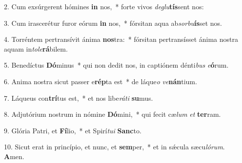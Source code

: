 2. Cum exsúrgerent hómines \textbf{in} nos,~*  forte vivos \textit{de}\textit{glu}\textbf{tís}sent nos:\

3. Cum irascerétur furor eórum \textbf{in} nos,~*  fórsitan aqua ab\textit{sor}\textit{bu}\textbf{ís}set nos.\

4. Torréntem pertransívit ánima \textbf{nos}tra:~*  fórsitan pertransísset ánima nostra aquam in\textit{to}\textit{le}\textbf{rá}bilem.\

5. Benedíctus \textbf{Dó}minus~*  qui non dedit nos, in captiónem dénti\textit{bus} \textit{e}\textbf{ó}rum.\

6. Anima nostra sicut passer e\textbf{rép}ta est~*  de láque\textit{o} \textit{ve}\textbf{nán}tium.\

7. Láqueus con\textbf{trí}tus est,~*  et nos libe\textit{rá}\textit{ti} \textbf{su}mus.\

8. Adjutórium nostrum in nómine \textbf{Dó}mini,~*  qui fecit cæ\textit{lum} \textit{et} \textbf{ter}ram.\

9. Glória Patri, et \textbf{Fí}lio,~*  et Spirí\textit{tu}\textit{i} \textbf{Sanc}to.\

10. Sicut erat in princípio, et nunc, et \textbf{sem}per,~*  et in sǽcula sæcu\textit{ló}\textit{rum}. \textbf{A}men.\


